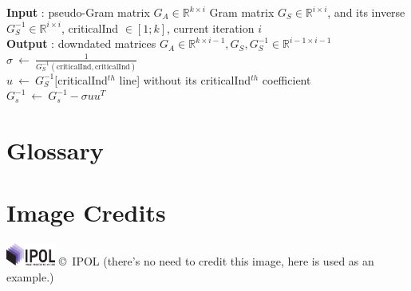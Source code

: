 \documentclass{ipol}
\newcommand{\dsize}{k}
\begin{document}
\begin{algorithm}[H]

\SetLine
\textbf{Input} : pseudo-Gram matrix $G_A \in \mathbb{R}^{\dsize \times i}$
Gram matrix $G_S \in \mathbb{R}^{i \times i}$, and its 
inverse $G_S^{-1}\in \mathbb{R}^{i \times i}$, criticalInd $\in [1; \dsize]$, current iteration $i$\\
\textbf{Output} : downdated matrices $G_A \in \mathbb{R}^{\dsize \times i-1}, G_S, G_S^{-1} \in \mathbb{R}^{i-1 \times i-1}$\\

$\sigma \ \leftarrow \ \frac{1}{G_S^{-1}(\text{criticalInd}, \text{criticalInd})}$\\
$u \ \leftarrow \ G_S^{-1} [$criticalInd$^{th}$ line] without its criticalInd$^{th}$ coefficient\\
$G_s^{-1} \ \leftarrow \ G_s^{-1}-\sigma u u^T$\\

\caption{Downdate invert algorithm {\color{red} downdateGram} {\color{blue} Marc: Algo correspondant, mais \`a valider.}}

\end{algorithm}

\section*{Glossary}



\section*{Image Credits}

\includegraphics[height=2em]{ipol_logo} \copyright\ IPOL (there's no
need to credit this image, here is used as an example.)
\end{document}

